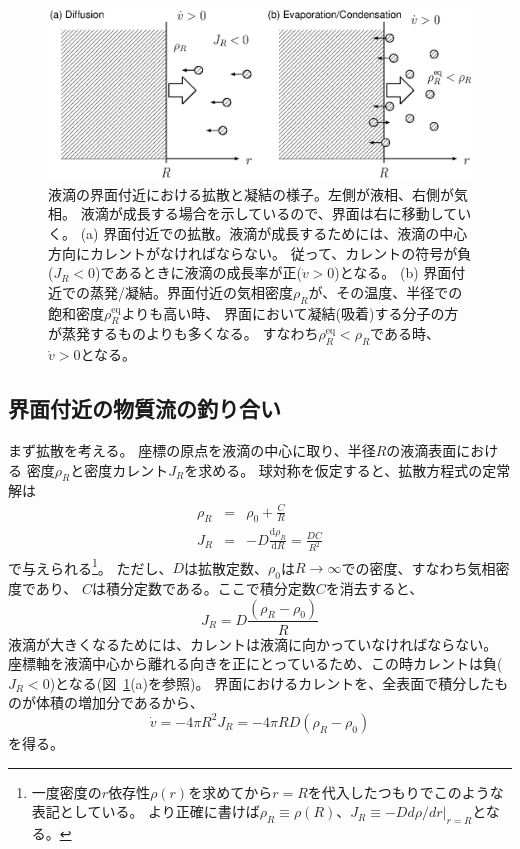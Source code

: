 \documentclass{jarticle}
\newcommand{\diff}{{\mathrm d}}
\begin{document}
\begin{figure}[tbh]
    \begin{center}
        \includegraphics[width=14cm]{growth.eps}
    \end{center}
    \caption{
        液滴の界面付近における拡散と凝結の様子。左側が液相、右側が気相。
        液滴が成長する場合を示しているので、界面は右に移動していく。
        (a) 界面付近での拡散。液滴が成長するためには、液滴の中心方向にカレントがなければならない。
        従って、カレントの符号が負($J_R<0$)であるときに液滴の成長率が正($\dot{v} >0$)となる。
        (b) 界面付近での蒸発/凝結。界面付近の気相密度$\rho_R$が、その温度、半径での飽和密度$\rho_R^{\mathrm{eq}}$よりも高い時、
        界面において凝結(吸着)する分子の方が蒸発するものよりも多くなる。
        すなわち$\rho_R^{\mathrm{eq}} < \rho_R$である時、$\dot{v}>0$となる。
    }
    \label{fig_growth}
\end{figure}

\subsection{界面付近の物質流の釣り合い}

まず拡散を考える。
座標の原点を液滴の中心に取り、半径$R$の液滴表面における
密度$\rho_R$と密度カレント$J_R$を求める。
球対称を仮定すると、拡散方程式の定常解は
\begin{eqnarray}
    \rho_R &=& \rho_0 + \frac{C}{R}\\
    J_R &=& -D \frac{\diff \rho_R}{\diff R} = \frac{DC}{R^2}
\end{eqnarray}
で与えられる\footnote{一度密度の$r$依存性$\rho(r)$を求めてから$r=R$を代入したつもりでこのような表記としている。
より正確に書けば$\rho_R \equiv \rho(R)$、$J_R \equiv - D \left. d \rho/dr\right|_{r=R}$となる。}。
ただし、$D$は拡散定数、$\rho_0$は$R \rightarrow \infty$での密度、すなわち気相密度であり、
$C$は積分定数である。ここで積分定数$C$を消去すると、
\begin{equation}
    J_R = D \frac{(\rho_R - \rho_0)}{R}
\end{equation}
液滴が大きくなるためには、カレントは液滴に向かっていなければならない。
座標軸を液滴中心から離れる向きを正にとっているため、この時カレントは負($J_R<0$)となる(図~\ref{fig_growth}(a)を参照)。
界面におけるカレントを、全表面で積分したものが体積の増加分であるから、
\begin{equation}
    \dot{v} = - 4 \pi R^2 J_R = - 4\pi RD(\rho_R - \rho_0 ) \label{eq_diffusion}
\end{equation}
を得る。
\end{document}

